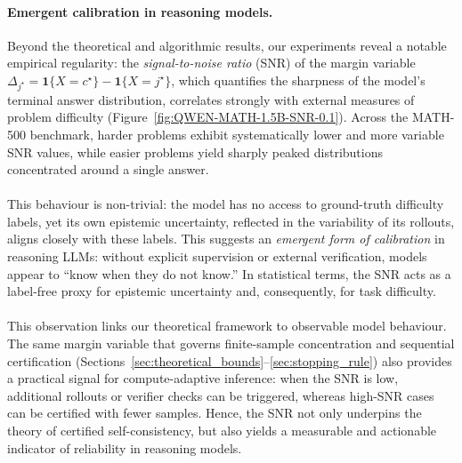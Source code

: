 \documentclass{article} %
\begin{document}
\paragraph{Emergent calibration in reasoning models.}
Beyond the theoretical and algorithmic results, our experiments reveal a notable empirical regularity: the
\emph{signal-to-noise ratio} (SNR) of the margin variable 
\(\Delta_{j^\star} = \mathbf 1\{X = c^\star\} - \mathbf 1\{X = j^\star\}\),
which quantifies the sharpness of the model’s terminal answer distribution,
correlates strongly with external measures of problem difficulty (Figure~\ref{fig:QWEN-MATH-1.5B-SNR-0.1}).
Across the MATH-500 benchmark, harder problems exhibit systematically lower and more variable SNR values,
while easier problems yield sharply peaked distributions concentrated around a single answer.
\\\\
This behaviour is non-trivial: the model has no access to ground-truth difficulty labels, yet its own epistemic
uncertainty, reflected in the variability of its rollouts, aligns closely with these labels.
This suggests an \emph{emergent form of calibration} in reasoning LLMs:
without explicit supervision or external verification, models appear to ``know when they do not know.''
In statistical terms, the SNR acts as a label-free proxy for epistemic uncertainty and, consequently, for task difficulty.
\\\\
This observation links our theoretical framework to observable model behaviour.
The same margin variable that governs finite-sample concentration and sequential certification (Sections~\ref{sec:theoretical_bounds}--\ref{sec:stopping_rule})
also provides a practical signal for compute-adaptive inference:
when the SNR is low, additional rollouts or verifier checks can be triggered,
whereas high-SNR cases can be certified with fewer samples.
Hence, the SNR not only underpins the theory of certified self-consistency,
but also yields a measurable and actionable indicator of reliability in reasoning models.
\end{document}
